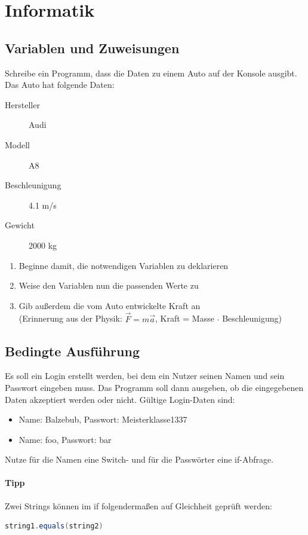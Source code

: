 \documentclass[11pt, a4paper]{article}
\begin{document}
\newpage
\section{Informatik}
\subsection{Variablen und Zuweisungen}
Schreibe ein Programm, dass die Daten zu einem Auto auf der Konsole ausgibt. Das Auto hat folgende Daten:
\begin{description}
	\item[Hersteller] Audi
	\item[Modell] A8
	\item[Beschleunigung] 4.1 m/s
	\item[Gewicht] 2000 kg
\end{description}
\begin{enumerate}
	\item Beginne damit, die notwendigen Variablen zu deklarieren
	\item Weise den Variablen nun die passenden Werte zu
	\item Gib außerdem die vom Auto entwickelte Kraft an \\
	(Erinnerung aus der Physik: $\vec{F}=m\vec{a}$, Kraft = Masse $\cdot$ Beschleunigung)
\end{enumerate}

\subsection{Bedingte Ausführung}
Es soll ein Login erstellt werden, bei dem ein Nutzer seinen Namen und sein Passwort eingeben muss. Das Programm soll dann ausgeben, ob die eingegebenen Daten akzeptiert werden oder nicht. Gültige Login-Daten sind:
\begin{itemize}
	\item Name: Balzebub, Passwort: Meisterklasse1337
	\item Name: foo, Passwort: bar
\end{itemize}
Nutze für die Namen eine Switch- und für die Passwörter eine if-Abfrage.
\paragraph{Tipp} Zwei Strings können im if folgendermaßen auf Gleichheit geprüft werden:
\begin{lstlisting}[language=Java, tabsize=4]
	string1.equals(string2)
\end{lstlisting}
\end{document}
